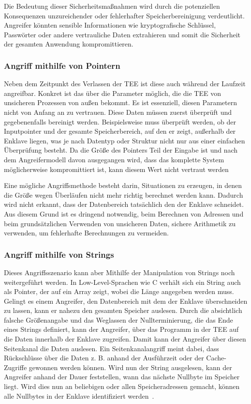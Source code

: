 Die Bedeutung dieser Sicherheitsmaßnahmen wird durch die potenziellen Konsequenzen unzureichender oder fehlerhafter Speicherbereinigung verdeutlicht. Angreifer könnten sensible Informationen wie kryptografische Schlüssel, Passwörter oder andere vertrauliche Daten extrahieren und somit die Sicherheit der gesamten Anwendung kompromittieren.

\subsubsection{Angriff mithilfe von Pointern}
Neben dem Zeitpunkt des Verlassen der TEE ist diese auch während der Laufzeit angreifbar. Konkret ist das über die Parameter möglich, die die TEE von unsicheren Prozessen von außen bekommt. Es ist essenziell, diesen Parametern nicht von Anfang an zu vertrauen. Diese Daten müssen zuerst überprüft und gegebenenfalls bereinigt werden.  Beispielsweise muss überprüft werden, ob der Inputpointer und der gesamte Speicherbereich, auf den er zeigt, außerhalb der Enklave liegen, was je nach Datentyp oder Struktur nicht nur aus einer einfachen Überprüfung besteht. Da die Größe des Pointers Teil der Eingabe ist und nach dem Angreifermodell davon ausgegangen wird, dass das komplette System möglicherweise kompromittiert ist, kann diesem Wert nicht vertraut werden

Eine mögliche Angriffsmethode besteht darin, Situationen zu erzeugen, in denen die Größe wegen Überläufen nicht mehr richtig berechnet werden kann. Dadurch wird nicht erkannt, dass der Datenbereich tatsächlich den der Enklave schneidet. Aus diesem Grund ist es dringend notwendig, beim Berechnen von Adressen und beim grundsätzlichen Verwenden von unsicheren Daten, sichere Arithmetik zu verwenden, um fehlerhafte Berechnungen zu vermeiden.

\subsubsection{Angriff mithilfe von Strings}
Dieses Angriffsszenario kann aber Mithilfe der Manipulation von Strings noch weitergeführt werden. In Low-Level-Sprachen wie C verhält sich ein String auch als Pointer, der auf ein Array zeigt, wobei die Länge angegeben werden muss. 
Gelingt es einem Angreifer, den Datenbereich mit dem der Enklave überschneiden zu lassen, kann er nahezu den gesamten Speicher auslesen. Durch die absichtlich falsche Größenangabe und das Weglassen der Nullterminierung, die das Ende eines Strings definiert, kann der Angreifer, über das Programm in der TEE auf die Daten innerhalb der Enklave zugreifen. 
Damit kann der Angreifer über diesen Seitenkanal die Daten auslesen. 
Ein Seitenkanalangriff meint dabei, dass Rückschlüsse über die Daten z. B. anhand der Ausführzeit oder der Cache-Zugriffe gewonnen werden können. Wird nun der String ausgelesen, kann der Angreifer anhand der Dauer feststellen, wann das nächste Nullbyte im Speicher liegt. 
Wird dies nun an beliebigen oder allen Speicheradressen gemacht, können alle Nullbytes in der Enklave identifiziert werden~\cite{TEEPaper}.

